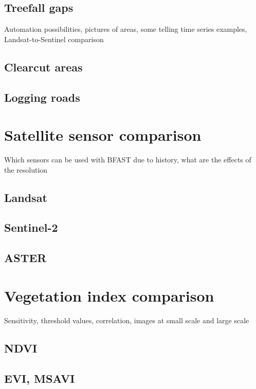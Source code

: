 \documentclass[a4paper,12pt]{scrbook}
\begin{document}
\subsection{Treefall gaps}

Automation possibilities, pictures of areas, some telling time series examples, Landsat-to-Sentinel comparison

\subsection{Clearcut areas}

\subsection{Logging roads}

\section{Satellite sensor comparison}

Which sensors can be used with BFAST due to history, what are the effects of the resolution

\subsection{Landsat}

\subsection{Sentinel-2}

\subsection{ASTER}

\section{Vegetation index comparison}

Sensitivity, threshold values, correlation, images at small scale and large scale

\subsection{NDVI}

\subsection{EVI, MSAVI}
\end{document}
